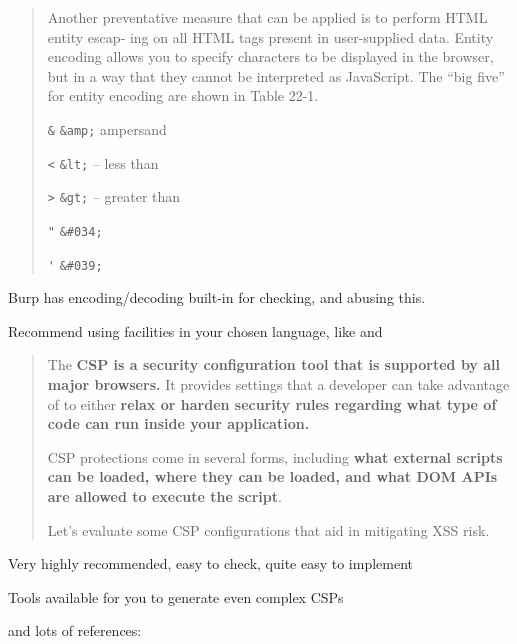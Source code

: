 \documentclass[Screen16to9,17pt]{foils}
\begin{document}

\begin{quote}
Another preventative measure that can be applied is to perform HTML entity escap‐
ing on all HTML tags present in user-supplied data. Entity encoding allows you to
specify characters to be displayed in the browser, but in a way that they cannot be
interpreted as JavaScript.
The “big five” for entity encoding are shown in Table 22-1.

\begin{list2}
\item \verb+&+ \verb+&amp;+ ampersand
\item \verb+<+ \verb+&lt;+ -- less than
\item \verb+>+ \verb+&gt;+ -- greater than
\item \verb+"+ \verb+&#034;+
\item \verb+'+ \verb+&#039;+
\end{list2}
\end{quote}

Burp has encoding/decoding built-in for checking, and abusing this.

Recommend using facilities in your chosen language, like
 and




\begin{quote}
The {\bf CSP is a security configuration tool that is supported by all major browsers.} It provides settings that a developer can take advantage of to either {\bf relax or harden security rules regarding what type of code can run inside your application.}

CSP protections come in several forms, including {\bf what external scripts can be loaded, where they can be loaded, and what DOM APIs are allowed to execute the script}.

Let’s evaluate some CSP configurations that aid in mitigating XSS risk.
\end{quote}

\begin{list2}
\item Very highly recommended, easy to check, quite easy to implement
\item Tools available for you to generate even complex CSPs
\item and lots of references:\\
\\
\end{list2}
\end{document}

